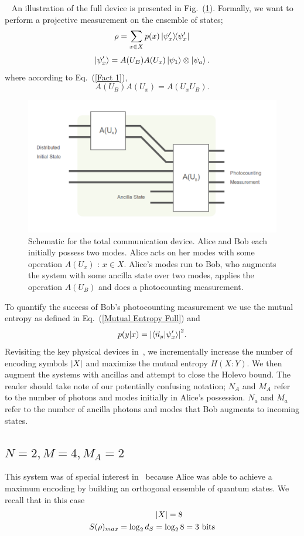 \documentclass[aps,pra,twocolumn,showpacs,superscriptaddress,floatfix,10pt]{revtex4}
\begin{document}
~
\newline
An illustration of the full device is presented in Fig.~(\ref{Total Quantum Channel Device}).
Formally, we want to perform a projective measurement on the ensemble of states;
\begin{equation}
\rho = \sum_{x \in X}  p(x) \outerproduct{\psi_x^\prime}{\psi_x^\prime}
\end{equation}
\begin{equation}
\ket{\psi_x^\prime} = A(U_B) A(U_x) \ket{\psi_1} \otimes \ket{\psi_a}.
\end{equation}
where according to Eq.~(\ref{Fact 1}),
\begin{equation}
A(U_B) A(U_x) = A(U_x U_B).
\end{equation}
\begin{figure}[ht]
	\centering
	\includegraphics[width= 0.5 \textwidth]{./GlobalApparatus.pdf}
	\caption{Schematic for the total communication device. Alice and Bob each initially possess two modes. Alice acts on her modes with some operation $A(U_x)$ : $x \in X$. Alice's modes run to Bob, who augments the system with some ancilla state over two modes, applies the operation $A(U_B)$ and does a photocounting measurement.}
	\label{Total Quantum Channel Device}
\end{figure}
\newline
To quantify the success of Bob's photocounting measurement we use the mutual entropy as defined in Eq.~(\ref{Mutual Entropy Full}) and 
\begin{equation}
p(y|x) = \abs{\braket{\vec{n}_y}{\psi_x^\prime}}^2.
\end{equation}
Revisiting the key physical devices in~\cite{First Paper}, we incrementally increase the number of encoding symbols $\abs{X}$ and maximize the mutual entropy $H(X:Y)$. We then augment the systems with ancillas and attempt to close the Holevo bound. The reader should take note of our potentially confusing notation; $N_A$ and $M_A$ refer to the number of photons and modes initially in Alice's possession. $N_a$ and $M_a$ refer to the number of ancilla photons and modes that Bob augments to incoming states.
\subsection{$N=2,M=4,M_A=2$}
This system was of special interest in~\cite{First Paper} because Alice was able to achieve a maximum encoding by building an orthogonal ensemble of quantum states. We recall that in this case
\begin{eqnarray}
\abs{X} = 8 \quad \quad \quad \quad  \\
S(\rho)_{max} = \log_2 d_S = \log_2 8 = 3 \mbox{ bits}
\end{eqnarray}
\end{document}
